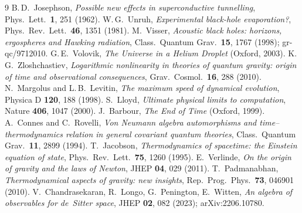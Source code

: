 \documentclass[11pt]{article}
\begin{document}
\begin{thebibliography}{9}
 B.\,D.\ Josephson, \emph{Possible new effects in
  superconductive tunnelling}, Phys.\ Lett.\ \textbf{1}, 251 (1962).
 W.\,G.\ Unruh, \emph{Experimental black-hole evaporation?},
  Phys.\ Rev.\ Lett.\ \textbf{46}, 1351 (1981).
 M.\ Visser, \emph{Acoustic black holes: horizons, ergospheres
  and Hawking radiation}, Class.\ Quantum Grav.\ \textbf{15}, 1767 (1998);
  gr-qc/9712010.
 G.\,E.\ Volovik, \emph{The Universe in a Helium Droplet}
  (Oxford, 2003).
 K.\,G.\ Zloshchastiev, \emph{Logarithmic nonlinearity in
  theories of quantum gravity: origin of time and observational consequences},
  Grav.\ Cosmol.\ \textbf{16}, 288 (2010).
 N.\ Margolus and L.\,B.\ Levitin, \emph{The maximum speed of
  dynamical evolution}, Physica D \textbf{120}, 188 (1998).
 S.\ Lloyd, \emph{Ultimate physical limits to computation},
  Nature \textbf{406}, 1047 (2000).
 J.\ Barbour, \emph{The End of Time} (Oxford, 1999).
 A.\ Connes and C.\ Rovelli, \emph{Von Neumann algebra
  automorphisms and time--thermodynamics relation in general covariant quantum
  theories}, Class.\ Quantum Grav.\ \textbf{11}, 2899 (1994).
 T.\ Jacobson, \emph{Thermodynamics of spacetime: the Einstein
  equation of state}, Phys.\ Rev.\ Lett.\ \textbf{75}, 1260 (1995).
 E.\ Verlinde, \emph{On the origin of gravity and the laws of
  Newton}, JHEP \textbf{04}, 029 (2011).
 T.\ Padmanabhan, \emph{Thermodynamical aspects of gravity:
  new insights}, Rep.\ Prog.\ Phys.\ \textbf{73}, 046901 (2010).
 V.\ Chandrasekaran, R.\ Longo, G.\ Penington, E.\ Witten,
  \emph{An algebra of observables for de~Sitter space}, JHEP \textbf{02}, 082
  (2023); arXiv:2206.10780.
\end{thebibliography}
\end{document}
